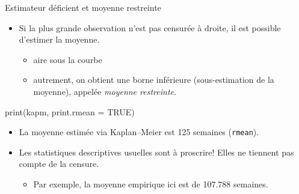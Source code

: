 \documentclass[
  ignorenonframetext,
]{beamer}
\newenvironment{Shaded}{\begin{snugshade}}{\end{snugshade}}
\newcommand{\AttributeTok}[1]{\textcolor[rgb]{0.40,0.45,0.13}{#1}}
\newcommand{\ConstantTok}[1]{\textcolor[rgb]{0.56,0.35,0.01}{#1}}
\newcommand{\FunctionTok}[1]{\textcolor[rgb]{0.28,0.35,0.67}{#1}}
\newcommand{\NormalTok}[1]{\textcolor[rgb]{0.00,0.23,0.31}{#1}}
\providecommand{\tightlist}{%
  \setlength{\itemsep}{0pt}\setlength{\parskip}{0pt}}
\begin{document}
\begin{frame}[fragile]{Estimateur déficient et moyenne restreinte}
\protect{}\label{estimateur-duxe9ficient-et-moyenne-restreinte}
\begin{itemize}
\tightlist
\item
  Si la plus grande observation n'est pas censurée à droite, il est
  possible d'estimer la moyenne.

  \begin{itemize}
  \tightlist
  \item
    aire sous la courbe
  \item
    autrement, on obtient une borne inférieure (sous-estimation de la
    moyenne), appelée \emph{moyenne restreinte}.
  \end{itemize}
\end{itemize}

\begin{Shaded}
\begin{Highlighting}[numbers=left,,]
\FunctionTok{print}\NormalTok{(kapm, }\AttributeTok{print.rmean =} \ConstantTok{TRUE}\NormalTok{)}
\end{Highlighting}
\end{Shaded}

\begin{itemize}
\tightlist
\item
  La moyenne estimée via Kaplan--Meier est 125 semaines
  (\texttt{rmean}).\\
\item
  Les statistiques descriptives usuelles sont à proscrire! Elles ne
  tiennent pas compte de la censure.

  \begin{itemize}
  \tightlist
  \item
    Par exemple, la moyenne empirique ici est de 107.788 semaines.
  \end{itemize}
\end{itemize}
\end{frame}
\end{document}
